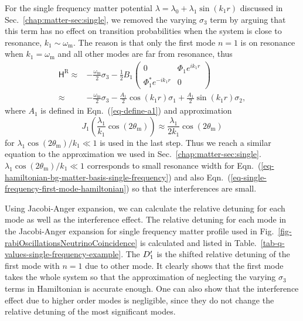 For the single frequency matter potential $\lambda = \lambda_0 + \lambda_1 \sin(k_1 r)$ discussed in Sec.~\ref{chap:matter-sec:single}, we removed the varying $\sigma_3$ term by arguing that this term has no effect on transition probabilities when the system is close to resonance, $k_1 \sim \omega_{\mathrm m}$. The reason is that only the first mode $n=1$ is on resonance when $k_1=\omega_{\mathrm m}$ and all other modes are far from resonance, thus
\begin{align}
\mathsf H^{\mathrm R} \approx & -\frac{\omega_{\mathrm m}}{2}\sigma_3 - \frac{1}{2} B_1 \begin{pmatrix}
0 & \Phi_1 e^{i k_1 r} \\
\Phi_1^* e^{-ik_1r} & 0
\end{pmatrix}\label{eq-single-frequency-first-mode-hamiltonian} \\
\approx & -\frac{\omega_{\mathrm m}}{2} \sigma_3 - \frac{A_1}{2} \cos(k_1 r) \sigma_1 + \frac{A_1}{2} \sin(k_1 r) \sigma_2\nonumber,
\end{align}
where $A_1$ is defined in Eqn.~(\ref{eq-define-a1}) and approximation
\begin{equation*}
J_1\left( \frac{\lambda_1}{k_1}\cos (2\theta_{\mathrm m}) \right) \approx \frac{\lambda_1}{2k_1}\cos (2\theta_{\mathrm m})
\end{equation*}
for $\lambda_1\cos(2\theta_{\mathrm m})/k_1\ll 1$ is used in the last step. Thus we reach a similar equation to the approximation we used in Sec.~\ref{chap:matter-sec:single}. $\lambda_1\cos(2\theta_{\mathrm m})/k_1\ll 1$ corresponds to small resonance width for Eqn.~(\ref{eq-hamiltonian-bg-matter-basis-single-frequency}) and also Eqn.~(\ref{eq-single-frequency-first-mode-hamiltonian}) so that the interferences are small.


Using Jacobi-Anger expansion, we can calculate the relative detuning for each mode as well as the interference effect. The relative detuning for each mode in the Jacobi-Anger expansion for single frequency matter profile used in Fig.~\ref{fig-rabiOscillationsNeutrinoCoincidence} is calculated and listed in Table.~\ref{tab-q-values-single-frequency-example}. The $D'_1$ is the shifted relative detuning of the first mode with $n=1$ due to other mode. It clearly shows that the first mode takes the whole system so that the approximation of neglecting the varying $\sigma_3$ terms in Hamiltonian is accurate enough. One can also show that the interference effect due to higher order modes is negligible, since they do not change the relative detuning of the most significant modes.



